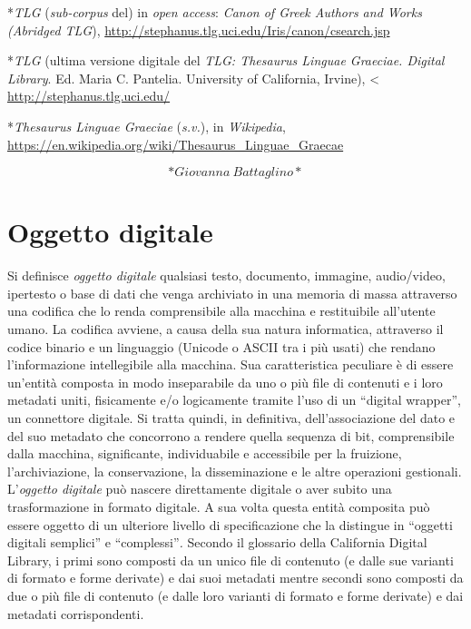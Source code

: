 \documentclass[
  b5paper,
  twoside,
  12pt,
  chapterprefix=false,
  bibliography=totocnumbered,
  parskip=false]{scrbook}
\begin{document}
*\emph{TLG} (\emph{sub-corpus} del) in \emph{open access}: \emph{Canon of Greek Authors and
Works (Abridged TLG}),
\url{http://stephanus.tlg.uci.edu/Iris/canon/csearch.jsp}

*\emph{TLG} (ultima versione digitale del \emph{TLG: Thesaurus Linguae Graeciae.
Digital Library}. Ed. Maria C. Pantelia. University of California,
Irvine), \textless{}
\url{http://stephanus.tlg.uci.edu/}

*\emph{Thesaurus Linguae Graeciae} (\emph{s.v.}), in \emph{Wikipedia},
\url{https://en.wikipedia.org/wiki/Thesaurus_Linguae_Graecae}

\[*Giovanna~Battaglino*\]

\hypertarget{oggetto-digitale}{%
\chapter{Oggetto digitale}\label{oggetto-digitale}}

Si definisce \emph{oggetto digitale} qualsiasi testo, documento, immagine,
audio/video, ipertesto o base di dati che venga archiviato in una
memoria di massa attraverso una codifica che lo renda comprensibile alla
macchina e restituibile all'utente umano. La codifica avviene, a causa
della sua natura informatica, attraverso il codice binario e un
linguaggio (Unicode o ASCII tra i più usati) che rendano l'informazione
intellegibile alla macchina. Sua caratteristica peculiare è di essere
un'entità composta in modo inseparabile da uno o più file di contenuti e
i loro metadati uniti, fisicamente e/o logicamente tramite l'uso di un
\enquote{digital wrapper}, un connettore digitale. Si tratta quindi, in
definitiva, dell'associazione del dato e del suo metadato che concorrono
a rendere quella sequenza di bit, comprensibile dalla macchina,
significante, individuabile e accessibile per la fruizione,
l'archiviazione, la conservazione, la disseminazione e le altre
operazioni gestionali. L'\emph{oggetto digitale} può nascere direttamente
digitale o aver subito una trasformazione in formato digitale. A sua
volta questa entità composita può essere oggetto di un ulteriore livello
di specificazione che la distingue in \enquote{oggetti digitali semplici} e
\enquote{complessi}\emph{.} Secondo il glossario della California Digital Library, i
primi sono composti da un unico file di contenuto (e dalle sue varianti
di formato e forme derivate) e dai suoi metadati mentre secondi sono
composti da due o più file di contenuto (e dalle loro varianti di
formato e forme derivate) e dai metadati corrispondenti.
\end{document}
